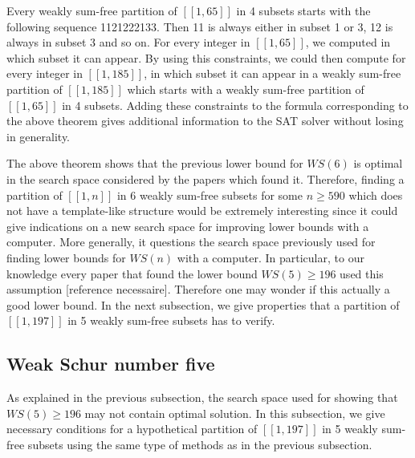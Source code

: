 \documentclass{article}
\newtheorem{computational theorem}{Computational Theorem}[theorem]
\begin{document}
\par
Every weakly sum-free partition of \([\![1,65]\!]\) in 4 subsets starts with the following sequence 1121222133. Then 11 is always 
either in subset 1 or 3, 12 is always in subset 3 and so on. For every integer in \([\![1,65]\!]\), we computed in which subset it can appear. 
By using this constraints, we could then compute for every integer in \([\![1,185]\!]\), in which subset it can appear in a weakly sum-free 
partition of  \([\![1,185]\!]\) which starts with a  weakly sum-free partition of \([\![1,65]\!]\) in 4 subsets. Adding these constraints to the 
formula corresponding to the above theorem gives additional information to the SAT solver without losing in generality.

\par
The above theorem shows that the previous lower bound for \(WS(6)\) is optimal in the search space considered by the papers which found it. 
Therefore, finding a partition of \([\![1,n]\!]\) in 6 weakly sum-free subsets for some \(n \geq 590\) which does not have a template-like structure 
would be extremely interesting since it could give indications on a new search space for improving lower bounds with a computer. More generally, 
it questions the search space previously used for finding lower bounds for \(WS(n)\) with a computer. In particular, to our knowledge every paper 
that found the lower bound \(WS(5) \geq 196\) used this assumption [reference necessaire]. Therefore one may wonder if this actually a good lower 
bound. In the next subsection, we give properties that a partition of \([\![1,197]\!]\) in 5 weakly sum-free subsets has to verify.


\subsection{Weak Schur number five}
As explained in the previous subsection, the search space used for showing that  \(WS(5) \geq 196\) may not contain optimal solution. In this subsection, 
we give necessary conditions for a hypothetical partition of \([\![1,197]\!]\) in 5 weakly sum-free subsets using the same type of methods as in the
 previous subsection.
\end{document}
